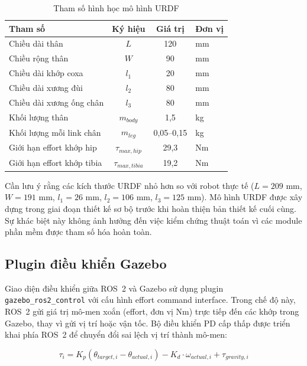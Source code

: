 \begin{table}[H]
\centering
\caption{Tham số hình học mô hình URDF}
\label{tab:urdf_params}
\renewcommand{\arraystretch}{1.3}
\begin{tabular}{|l|c|c|l|}
\hline
\textbf{Tham số} & \textbf{Ký hiệu} & \textbf{Giá trị} & \textbf{Đơn vị} \\ \hline
Chiều dài thân & $L$ & 120 & mm \\ \hline
Chiều rộng thân & $W$ & 90 & mm \\ \hline
Chiều dài khớp coxa & $l_1$ & 20 & mm \\ \hline
Chiều dài xương đùi & $l_2$ & 80 & mm \\ \hline
Chiều dài xương ống chân & $l_3$ & 80 & mm \\ \hline
Khối lượng thân & $m_{body}$ & 1,5 & kg \\ \hline
Khối lượng mỗi link chân & $m_{leg}$ & 0,05--0,15 & kg \\ \hline
Giới hạn effort khớp hip & $\tau_{max,hip}$ & 29,3 & Nm \\ \hline
Giới hạn effort khớp tibia & $\tau_{max,tibia}$ & 19,2 & Nm \\ \hline
\end{tabular}
\end{table}

Cần lưu ý rằng các kích thước URDF nhỏ hơn so với robot thực tế ($L=209$ mm, $W=191$ mm, $l_1=26$ mm, $l_2=106$ mm, $l_3=125$ mm). Mô hình URDF được xây dựng trong giai đoạn thiết kế sơ bộ trước khi hoàn thiện bản thiết kế cuối cùng. Sự khác biệt này không ảnh hưởng đến việc kiểm chứng thuật toán vì các module phần mềm được tham số hóa hoàn toàn.

\subsection{Plugin điều khiển Gazebo}

Giao diện điều khiển giữa ROS~2 và Gazebo sử dụng plugin \texttt{gazebo\_ros2\_control} với cấu hình effort command interface. Trong chế độ này, ROS~2 gửi giá trị mô-men xoắn (effort, đơn vị Nm) trực tiếp đến các khớp trong Gazebo, thay vì gửi vị trí hoặc vận tốc. Bộ điều khiển PD cấp thấp được triển khai phía ROS~2 để chuyển đổi sai lệch vị trí thành mô-men:

\begin{equation}
    \tau_i = K_p (\theta_{target,i} - \theta_{actual,i}) - K_d \cdot \omega_{actual,i} + \tau_{gravity,i}
\end{equation}

